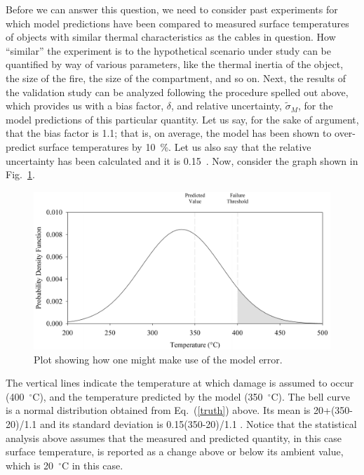Before we can answer this question, we need to consider past experiments for which model predictions have been compared to measured surface temperatures of objects
with similar thermal characteristics as the cables in question. How ``similar'' the experiment is to the hypothetical scenario under study can be quantified by way of
various parameters, like the thermal inertia of the object, the size of the fire, the size of the compartment, and so on. Next, the results of the validation study can be
analyzed following the procedure spelled out above, which provides us with a bias factor, $\delta$, and relative uncertainty, $\tilde{\sigma}_M$, for the model
predictions of this particular quantity. Let us say, for the sake of argument, that the bias factor is 1.1; that is, on average, the model has been shown to over-predict
surface temperatures by 10~\%. Let us also say that the relative uncertainty has been calculated and it is 0.15~.
Now, consider the graph shown in Fig.~\ref{bell_curve}.
\begin{figure}[ht]
\begin{center}
\includegraphics[width=5.in]{FIGURES/bell_curve}
\end{center}
\caption[Demonstration of model error.]{Plot showing how one might make use of the model error.}
\label{bell_curve}
\end{figure}
The vertical lines indicate the temperature at which damage is assumed to occur (400~$^\circ$C), and the temperature predicted by the
model (350~$^\circ$C). The bell curve is a normal distribution obtained from Eq.~(\ref{truth}) above. Its mean is 20+(350-20)/1.1 and its standard deviation
is 0.15(350-20)/1.1 . Notice that the statistical analysis
above assumes that the measured and predicted quantity, in this case surface temperature, is reported as a change above or below its ambient value, which is
20~$^\circ$C in this case.


